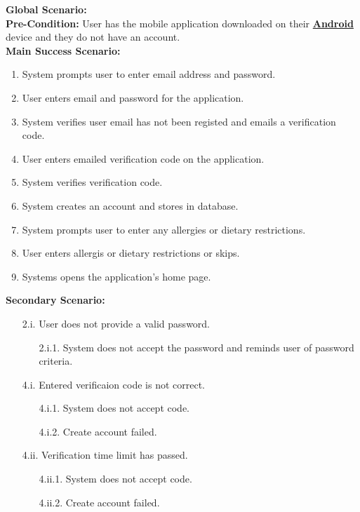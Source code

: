 \documentclass[]{article}
\begin{document}
\begin{enumerate}[{\bf BE1.}]
		{\bf Global Scenario:} \\
		\textbf{Pre-Condition:} User has the mobile application downloaded on their \hyperref[Android]{\textbf{Android}} device and they do not have an account. \\
		\textbf{Main Success Scenario:} 
		\begin{enumerate}[{1.}]
			\item System prompts user to enter email address and password.
			\item User enters email and password for the application.
			\item System verifies user email has not been registed and emails a verification code.
			\item User enters emailed verification code on the application.
			\item System verifies verification code.
			\item System creates an account and stores in database.
			\item System prompts user to enter any allergies or dietary restrictions.
			\item User enters allergis or dietary restrictions or skips.
			\item Systems opens the application's home page.
		\end{enumerate}
		\textbf{Secondary Scenario:}
		\begin{enumerate}
			\item[2.i.] User does not provide a valid password.
			\begin{enumerate}
				\item[2.i.1.] System does not accept the password and reminds user of password criteria.
			\end{enumerate}
		\end{enumerate}
		\begin{enumerate}
			\item[4.i.] Entered verificaion code is not correct.
			\begin{enumerate}
				\item[4.i.1.] System does not accept code.
				\item[4.i.2.] Create account failed.
			\end{enumerate}
			\item[4.ii.] Verification time limit has passed.
			\begin{enumerate}
				\item[4.ii.1.] System does not accept code.
				\item[4.ii.2.] Create account failed.
			\end{enumerate}
		\end{enumerate}


\end{enumerate}
\end{document}
